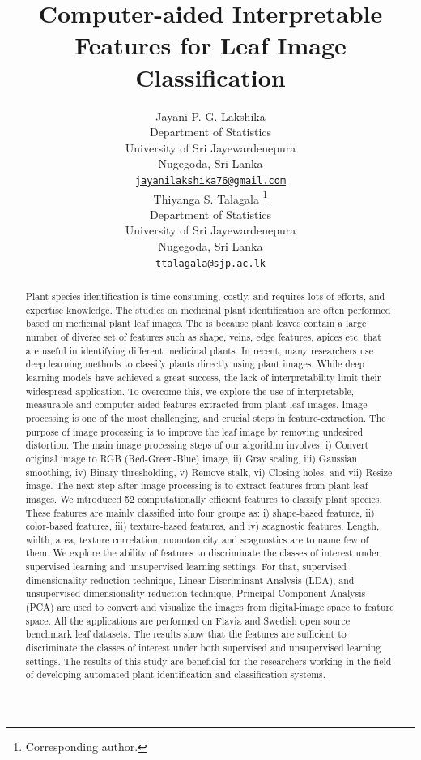 \documentclass{article}
\title{Computer-aided Interpretable Features for Leaf Image Classification}
\author{
    Jayani P. G. Lakshika
   \\
    Department of Statistics \\
    University of Sri Jayewardenepura \\
  Nugegoda, Sri Lanka \\
  \texttt{\href{mailto:jayanilakshika76@gmail.com}{\nolinkurl{jayanilakshika76@gmail.com}}} \\
   \And
    Thiyanga S. Talagala
    \thanks{Corresponding author.}
   \\
    Department of Statistics \\
    University of Sri Jayewardenepura \\
  Nugegoda, Sri Lanka \\
  \texttt{\href{mailto:ttalagala@sjp.ac.lk}{\nolinkurl{ttalagala@sjp.ac.lk}}} \\
  }
\begin{document}
\maketitle

\def\tightlist{}


\begin{abstract}
Plant species identification is time consuming, costly, and requires
lots of efforts, and expertise knowledge. The studies on medicinal plant
identification are often performed based on medicinal plant leaf images.
The is because plant leaves contain a large number of diverse set of
features such as shape, veins, edge features, apices etc. that are
useful in identifying different medicinal plants. In recent, many
researchers use deep learning methods to classify plants directly using
plant images. While deep learning models have achieved a great success,
the lack of interpretability limit their widespread application. To
overcome this, we explore the use of interpretable, measurable and
computer-aided features extracted from plant leaf images. Image
processing is one of the most challenging, and crucial steps in
feature-extraction. The purpose of image processing is to improve the
leaf image by removing undesired distortion. The main image processing
steps of our algorithm involves: i) Convert original image to RGB
(Red-Green-Blue) image, ii) Gray scaling, iii) Gaussian smoothing, iv)
Binary thresholding, v) Remove stalk, vi) Closing holes, and vii) Resize
image. The next step after image processing is to extract features from
plant leaf images. We introduced 52 computationally efficient features
to classify plant species. These features are mainly classified into
four groups as: i) shape-based features, ii) color-based features, iii)
texture-based features, and iv) scagnostic features. Length, width,
area, texture correlation, monotonicity and scagnostics are to name few
of them. We explore the ability of features to discriminate the classes
of interest under supervised learning and unsupervised learning
settings. For that, supervised dimensionality reduction technique,
Linear Discriminant Analysis (LDA), and unsupervised dimensionality
reduction technique, Principal Component Analysis (PCA) are used to
convert and visualize the images from digital-image space to feature
space. All the applications are performed on Flavia and Swedish open
source benchmark leaf datasets. The results show that the features are
sufficient to discriminate the classes of interest under both supervised
and unsupervised learning settings. The results of this study are
beneficial for the researchers working in the field of developing
automated plant identification and classification systems.
\end{abstract}
\end{document}
